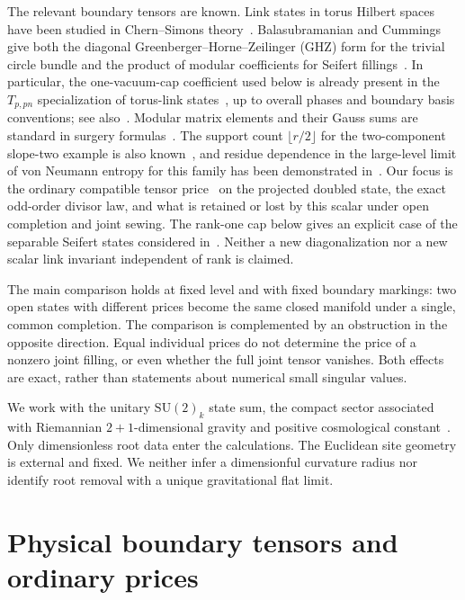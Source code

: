 \documentclass[11pt]{article}
\theoremstyle{remark}
\begin{document}
The relevant boundary tensors are known. Link states in torus Hilbert spaces have been studied in Chern--Simons theory~\cite{LinkStates,ColoredJones}. Balasubramanian and Cummings give both the diagonal Greenberger--Horne--Zeilinger (GHZ) form for the trivial circle bundle and the product of modular coefficients for Seifert fillings~\cite[Eqs.~(34)--(43) and (119)]{Fibered}. In particular, the one-vacuum-cap coefficient used below is already present in the \(T_{p,pn}\) specialization of torus-link states~\cite[Eqs.~(4.10)--(4.14)]{ColoredJones}, up to overall phases and boundary basis conventions; see also~\cite[Eq.~(3.31)]{Renyi}. Modular matrix elements and their Gauss sums are standard in surgery formulas~\cite{Jeffrey,Hansen,HansenTakata}. The support count \(\lfloor r/2\rfloor\) for the two-component slope-two example is also known~\cite[Eq.~(3.22)]{Linked}, and residue dependence in the large-level limit of von Neumann entropy for this family has been demonstrated in~\cite{Residue}. Our focus is the ordinary compatible tensor price~\cite{OpenAI} on the projected doubled state, the exact odd-order divisor law, and what is retained or lost by this scalar under open completion and joint sewing. The rank-one cap below gives an explicit case of the separable Seifert states considered in~\cite[Sec.~VI.C and Fig.~14]{Fibered}. Neither a new diagonalization nor a new scalar link invariant independent of rank is claimed.

The main comparison holds at fixed level and with fixed boundary markings: two open states with different prices become the same closed manifold under a single, common completion. The comparison is complemented by an obstruction in the opposite direction. Equal individual prices do not determine the price of a nonzero joint filling, or even whether the full joint tensor vanishes. Both effects are exact, rather than statements about numerical small singular values.

We work with the unitary \(\mathrm{SU}(2)_k\) state sum, the compact sector associated with Riemannian \(2+1\)-dimensional gravity and positive cosmological constant~\cite{MizoguchiTada,Gresnigt}. Only dimensionless root data enter the calculations. The Euclidean site geometry is external and fixed. We neither infer a dimensionful curvature radius nor identify root removal with a unique gravitational flat limit.

\section{Physical boundary tensors and ordinary prices}\label{sec:boundary}
\end{document}
